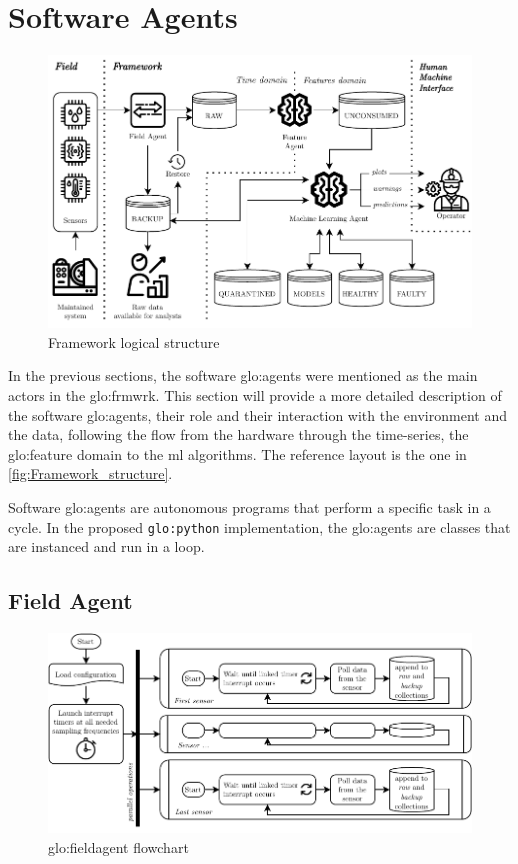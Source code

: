 \section{Software Agents}
\label{sec:agents}

\begin{figure}
    \centering
    \includegraphics[width=\textwidth]{images/Framework/Framework_structure.pdf}
    \caption{Framework logical structure}
    \label{fig:Framework_structure}
\end{figure}

In the previous sections, the software \gls{glo:agent}s were mentioned as the main actors in the \gls{glo:frmwrk}. This section will provide a more detailed description of the software \gls{glo:agent}s, their role and their interaction with the environment and the data, following the flow from the hardware through the time-series, the \gls{glo:feature} domain to the \gls{ml} algorithms. The reference layout is the one in \autoref{fig:Framework_structure}. 

Software \gls{glo:agent}s are autonomous programs that perform a specific task in a cycle. In the proposed \texttt{\gls{glo:python}} implementation, the \gls{glo:agent}s are classes that are instanced and run in a loop.

\subsection{Field Agent}
\label{subsec:FieldAgent}
\begin{figure}
    \centering
    \includegraphics[scale=1]{images/Framework/Field_Agent_flowchart.pdf}
    \caption{\gls{glo:fieldagent} flowchart}
    \label{fig:Field_Agent_flowchart}
\end{figure}

